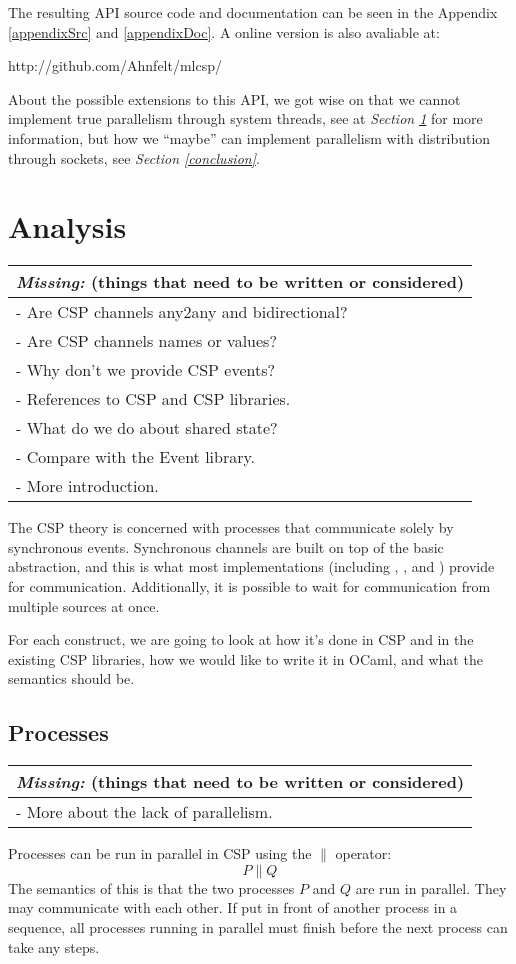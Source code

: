 \documentclass[a4paper,12pt]{article}
\newcommand{\missing}[1]{
\begin{tabular}{|p{11cm}|}
\hline
\emph{Missing:} {\scriptsize (things that need to be written or considered)} \\
\hline
#1
\hline
\end{tabular}
}
\begin{document}
The resulting API source code and documentation can be seen in the Appendix
\ref{appendixSrc} and \ref{appendixDoc}. A online version is also avaliable at:

\begin{center}
http://github.com/Ahnfelt/mlcsp/
\end{center}

About the possible extensions to this API, we got wise on that we cannot
implement true parallelism through system threads, see at {\it Section
\ref{analysis}} for more information, but how we ``maybe'' can implement
parallelism with distribution through sockets, see {\it Section 
\ref{conclusion}}.

\section{Analysis}
\label{analysis}
\missing{
- Are CSP channels any2any and bidirectional? \\
- Are CSP channels names or values? \\
- Why don't we provide CSP events? \\
- References to CSP and CSP libraries. \\
- What do we do about shared state?\\
- Compare with the Event library.\\
- More introduction.\\
}

The CSP theory is concerned with processes that communicate solely by synchronous 
events. Synchronous channels are built on top of the basic abstraction, and this is
what most implementations (including \cite{occam}, \cite{c++csp}, \cite{jcsp} and 
\cite{pycsp}) provide for communication. 
Additionally, it is possible to wait for communication from multiple sources at once.

For each construct, we are going to look at how it's done in CSP and in the 
existing CSP libraries, how we would like to write it in OCaml, and what the 
semantics should be.

\subsection{Processes}
\missing{
- More about the lack of parallelism.\\
}

Processes can be run in parallel in CSP using the $\parallel$ operator:
\[P \parallel Q\]
The semantics of this is that the two processes $P$ and $Q$ are run in parallel. They
may communicate with each other. If put in front of another process in a sequence, all
processes running in parallel must finish before the next process can take any steps.
\end{document}
